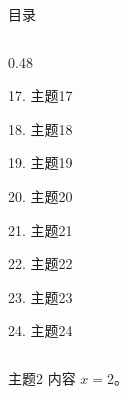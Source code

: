 \documentclass[aspectratio=169,10pt,fontset=fandol]{ctexbeamer}
\begin{document}
\begin{frame}[t,fragile]{目录}
\begin{columns}[T,onlytextwidth]
\begin{column}{0.48\textwidth}
{\color{gray!40}\small 17. 主题17\par}\vspace{0.22em}
{\color{gray!40}\small 18. 主题18\par}\vspace{0.22em}
{\color{gray!40}\small 19. 主题19\par}\vspace{0.22em}
{\color{gray!40}\small 20. 主题20\par}\vspace{0.22em}
{\color{gray!40}\small 21. 主题21\par}\vspace{0.22em}
{\color{gray!40}\small 22. 主题22\par}\vspace{0.22em}
{\color{gray!40}\small 23. 主题23\par}\vspace{0.22em}
{\color{gray!40}\small 24. 主题24\par}\vspace{0.22em}
\end{column}
\end{columns}
\end{frame}
\begin{frame}[t,fragile]{主题2}
\normalsize
{\normalsize
内容 $x=2$。
}
\end{frame}
\end{document}

